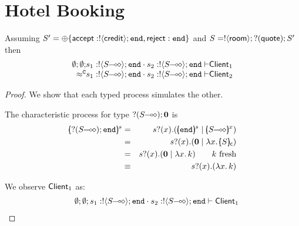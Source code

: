\section{Hotel Booking}
\label{hotel_closure}
\begin{proposition}
	Assuming $S' = \oplus \{\mathsf{accept}: ! \langle \mathsf{credit} \rangle ; \mathtt{end}, \mathsf{reject}: \mathtt{end}\}$ and
	$S = ! \langle \mathsf{room} \rangle ; ? (\mathsf{quote}) ; S'$
	then
\[
	\ahorel
	{\es}{s_1: \btout{\lhot{S}} \tinact \cat s_2: \btout{\lhot{S}} \tinact}{\Client_1}
	{\wbf}
	{s_1: \btout{\lhot{S}} \tinact \cat s_2: \btout{\lhot{S}} \tinact}{\Client_2}
\]
\end{proposition}

\begin{proof}
	We show that each typed process simulates the other.

	The characteristic process for type $? (S\!\! \multimap\!\! \diamond) ; \mathbf{0}$ is
	\begin{eqnarray*}
		\mapchar{\btinp{\lhot{S}} \tinact}{s} &=& \binp{s}{x} (\mapchar{\tinact}{s} \Par \mapchar{\lhot{S}}{x})\\
		&=& \binp{s}{x} (\inact \Par \abs{x}{\omapchar{S}})\\
		&=& \binp{s}{x} (\inact \Par \abs{x}{k}) \qquad k \textrm{ fresh}\\
		&\scong& \binp{s}{x} (\abs{x}{k})
	\end{eqnarray*}

	We observe $\mathsf{Client}_1$ as:
\[
	\begin{array}{ll}
		& \es; \es; s_1: \btout{\lhot{S}} \tinact \cat s_2: \btout{\lhot{S}} \tinact \proves \Client_1
\\


\end{array}\]
\end{proof}
